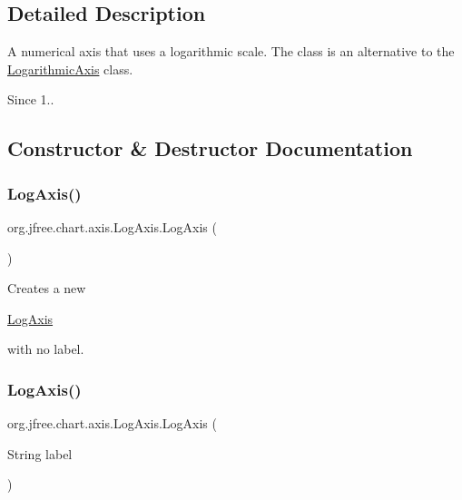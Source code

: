 \subsection{Detailed Description}
A numerical axis that uses a logarithmic scale. The class is an alternative to the \mbox{\hyperlink{classorg_1_1jfree_1_1chart_1_1axis_1_1_logarithmic_axis}{Logarithmic\+Axis}} class.

\begin{DoxySince}{Since}
1.. 
\end{DoxySince}


\subsection{Constructor \& Destructor Documentation}
\mbox{\label{classorg_1_1jfree_1_1chart_1_1axis_1_1_log_axis_af75e86e78639fb98a2c7e1c44c100c0c}} 
\subsubsection{\texorpdfstring{Log\+Axis()}{LogAxis()}\hspace{0.1cm}{\footnotesize\ttfamily [1/2]}}
{\footnotesize\ttfamily org.\+jfree.\+chart.\+axis.\+Log\+Axis.\+Log\+Axis (\begin{DoxyParamCaption}{ }\end{DoxyParamCaption})}

Creates a new
\begin{DoxyCode}
\mbox{\hyperlink{classorg_1_1jfree_1_1chart_1_1axis_1_1_log_axis_af75e86e78639fb98a2c7e1c44c100c0c}{LogAxis}} 
\end{DoxyCode}
 with no label. \mbox{\label{classorg_1_1jfree_1_1chart_1_1axis_1_1_log_axis_a19674eb399be3fa80564fcefd1bb8c5a}} 
\subsubsection{\texorpdfstring{Log\+Axis()}{LogAxis()}\hspace{0.1cm}{\footnotesize\ttfamily [2/2]}}
{\footnotesize\ttfamily org.\+jfree.\+chart.\+axis.\+Log\+Axis.\+Log\+Axis (\begin{DoxyParamCaption}\item[{String}]{label }\end{DoxyParamCaption})}

